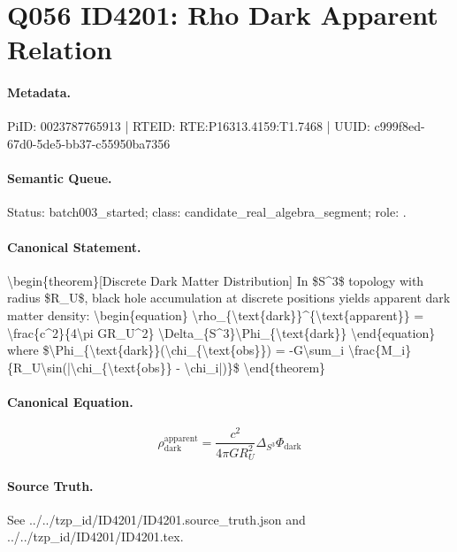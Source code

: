 \section*{Q056 ID4201: Rho Dark Apparent Relation}
\paragraph{Metadata.}
PiID: 0023787765913 | RTEID: RTE:P16313.4159:T1.7468 | UUID: c999f8ed-67d0-5de5-bb37-c55950ba7356

\paragraph{Semantic Queue.}
Status: batch003\_started; class: candidate\_real\_algebra\_segment; role: .

\paragraph{Canonical Statement.}
\textbackslash{}begin\{theorem\}[Discrete Dark Matter Distribution] In \$S\textasciicircum{}3\$ topology with radius \$R\_U\$, black hole accumulation at discrete positions yields apparent dark matter density: \textbackslash{}begin\{equation\} \textbackslash{}rho\_\{\textbackslash{}text\{dark\}\}\textasciicircum{}\{\textbackslash{}text\{apparent\}\} = \textbackslash{}frac\{c\textasciicircum{}2\}\{4\textbackslash{}pi GR\_U\textasciicircum{}2\} \textbackslash{}Delta\_\{S\textasciicircum{}3\}\textbackslash{}Phi\_\{\textbackslash{}text\{dark\}\} \textbackslash{}end\{equation\} where \$\textbackslash{}Phi\_\{\textbackslash{}text\{dark\}\}(\textbackslash{}chi\_\{\textbackslash{}text\{obs\}\}) = -G\textbackslash{}sum\_i \textbackslash{}frac\{M\_i\}\{R\_U\textbackslash{}sin(|\textbackslash{}chi\_\{\textbackslash{}text\{obs\}\} - \textbackslash{}chi\_i|)\}\$ \textbackslash{}end\{theorem\}

\paragraph{Canonical Equation.}
\[
\begin{equation} \rho_{\text{dark}}^{\text{apparent}} = \frac{c^2}{4\pi GR_U^2} \Delta_{S^3}\Phi_{\text{dark}} \end{equation}
\]

\paragraph{Source Truth.}
See ../../tzp\_id/ID4201/ID4201.source\_truth.json and ../../tzp\_id/ID4201/ID4201.tex.
